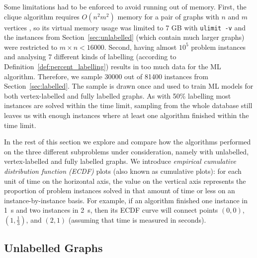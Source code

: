 \documentclass{l4proj}
\theoremstyle{definition}
\theoremstyle{remark}
\begin{document}
Some limitations had to be enforced to avoid running out of memory. First, the
clique algorithm requires $O(n^2m^2)$ memory for a pair of graphs with $n$ and
$m$ vertices \cite{DBLP:conf/aaai/HoffmannMR17, DBLP:conf/cp/McCreeshNPS16}, so
its virtual memory usage was limited to 7 GB with \texttt{ulimit -v} and the
instances from Section~\ref{sec:unlabelled} (which contain much larger graphs)
were restricted to $m \times n < \num{16000}$. Second, having almost $10^5$
problem instances and analysing 7 different kinds of labelling (according to
Definition~\ref{def:percent_labelling}) results in too much data for the ML
algorithm. Therefore, we sample \num{30000} out of \num{81400} instances from
Section~\ref{sec:labelled}. The sample is drawn once and used to train ML
models for both vertex-labelled and fully labelled graphs. As with 50\%
labelling most instances are solved within the time limit, sampling from the
whole database still leaves us with enough instances where at least one
algorithm finished within the time limit.

In the rest of this section we explore and compare how the algorithms performed
on the three different subproblems under consideration, namely with unlabelled,
vertex-labelled and fully labelled graphs. We introduce
\emph{empirical cumulative distribution function (ECDF)}
plots \cite{10.2307/2334448} (also known as cumulative plots): for each unit of
time on the horizontal axis, the value on the vertical axis represents the
proportion of problem instances solved in that amount of time or less on an
instance-by-instance basis. For example, if an algorithm finished one instance
in 1~s and two instances in 2~s, then its ECDF curve will connect points $(0,
0)$, $(1, \frac{1}{3})$, and $(2, 1)$ (assuming that time is measured in
seconds).

\subsection{Unlabelled Graphs}
\end{document}

